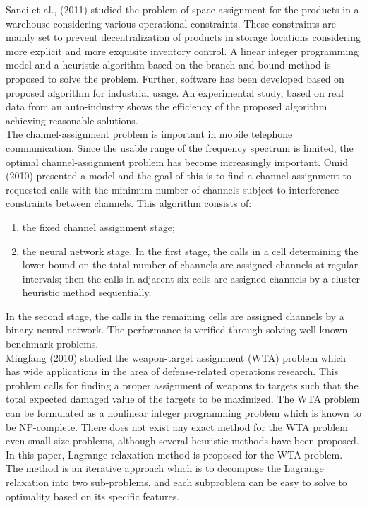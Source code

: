 \documentclass[11pt]{report}
\newcommand{\NI}{\noindent}
\renewcommand{\labelenumi}{\arabic{enumi})}
\begin{document}
	\NI Sanei et al., (2011) studied the problem of space assignment for the products in a warehouse considering various operational constraints. These constraints are mainly set to prevent decentralization of products in storage locations considering more explicit and more exquisite
	inventory control. A linear integer programming model and a heuristic algorithm based on the branch and bound method is proposed to solve the problem. Further, software has been developed based on proposed algorithm for industrial usage. An experimental study, based on real data from an auto-industry shows the efficiency of the proposed algorithm achieving reasonable solutions.\\
	The channel-assignment problem is important in mobile telephone communication. Since the usable range of the frequency spectrum is limited, the optimal channel-assignment problem has become increasingly important. Omid (2010) presented a model and the goal of this is to find a
	channel assignment to requested calls with the minimum number of channels subject to interference constraints between channels. This algorithm consists of: 
	\begin{enumerate}
		\renewcommand{\labelenumi}{(\roman{enumi})}
		\item the fixed channel assignment stage;
		\item the neural network stage. In the first stage, the calls in a cell determining the lower bound on the total number of channels are assigned channels at regular intervals; then the calls in adjacent six cells are assigned channels by a cluster heuristic method sequentially.
	\end{enumerate}
	 In the second stage, the calls in the remaining cells are assigned channels by a binary neural network. The performance is verified through solving well-known benchmark problems.\\
	 
	\NI Mingfang (2010) studied the weapon-target assignment (WTA) problem which has wide applications in the area of defense-related operations research. This problem calls for finding a proper assignment of weapons to targets such that the total expected damaged value of the targets to be maximized. The WTA problem can be formulated as a nonlinear integer programming problem which is known to be NP-complete. There does not exist any exact method for the WTA
	problem even small size problems, although several heuristic methods have been proposed. In this paper, Lagrange relaxation method is proposed for the WTA problem. The method is an iterative approach which is to decompose the Lagrange relaxation into two sub-problems, and each subproblem can be easy to solve to optimality based on its specific features.\\
	
\end{document}
